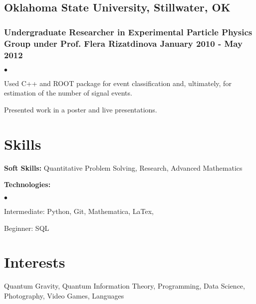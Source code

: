 \documentclass[letterpaper]{article}
\renewenvironment{itemize}{
  \begin{list}{$\bullet$}{
    \setlength{\itemsep}{0em}
    \setlength{\parskip}{0em}
    \setlength{\parsep}{0em} 
    \setlength{\topsep}{0em} 
  }
}{
  \end{list}
}
\begin{document}
\subsection*{Oklahoma State University, Stillwater, OK}
\subsubsection*{Undergraduate Researcher in Experimental Particle Physics Group under Prof. Flera Rizatdinova \hfill January 2010 - May 2012}
    \begin{itemize}
        \item Used C++ and ROOT package for event classification and, ultimately, for estimation of the number of signal events.
        \item Presented work in a poster and live presentations.
    \end{itemize}
    

\section*{Skills}

{\bf Soft Skills:} Quantitative Problem Solving, Research, Advanced Mathematics

{\bf Technologies:}
\begin{itemize}
	\item[] Intermediate: Python, Git, Mathematica, LaTex, 
	\item[] Beginner: SQL%
\end{itemize}
 


\section*{Interests}

Quantum Gravity, Quantum Information Theory, Programming, Data Science, Photography, Video Games, Languages
\end{document}
